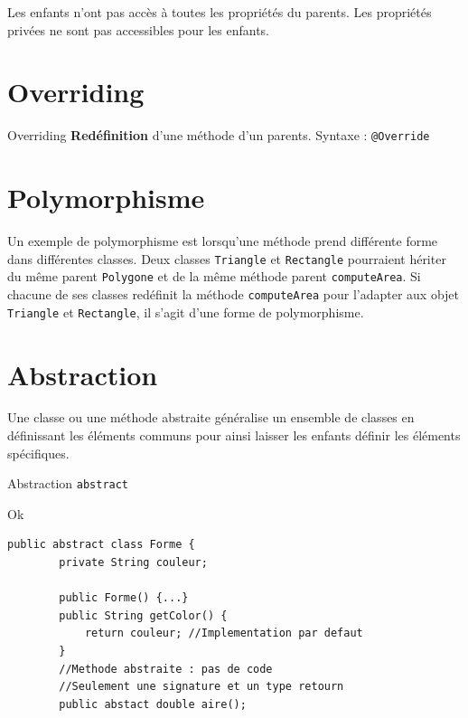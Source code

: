 \documentclass[16pt]{report}
\begin{document}
\begin{multicols*}{2}
            \begin{note}{}{}
                Les enfants n'ont pas accès à toutes les propriétés du parents. Les propriétés privées 
                ne sont pas accessibles pour les enfants. 
            \end{note}

            \section{Overriding}

            \begin{Definitionx}{Overriding}{}
                \textbf{Redéfinition} d'une méthode d'un parents. Syntaxe : \texttt{@Override}    
            \end{Definitionx}


            \section{Polymorphisme}
            Un exemple de polymorphisme est lorsqu'une méthode prend différente forme dans différentes classes. 
            Deux classes \texttt{Triangle} et \texttt{Rectangle} pourraient hériter du même parent 
            \texttt{Polygone} et de la même méthode parent \texttt{computeArea}. Si chacune de ses classes 
            redéfinit la méthode \texttt{computeArea} pour l'adapter aux objet \texttt{Triangle} et 
            \texttt{Rectangle}, il s'agit d'une forme de polymorphisme.   

            \section{Abstraction}
            Une classe ou une méthode abstraite généralise un ensemble de classes en définissant les 
            \textcolor{myb}{éléments communs} pour ainsi laisser les enfants définir les éléments spécifiques. 
            \begin{Syntaxe}{Abstraction}{}
                \texttt{abstract}  
            \end{Syntaxe}


\begin{EExample}{Ok}{}
    
\begin{lstlisting}[style=JavaDraculaWhite]
    public abstract class Forme {
        private String couleur; 

        public Forme() {...} 
        public String getColor() { 
            return couleur; //Implementation par defaut
        }
        //Methode abstraite : pas de code 
        //Seulement une signature et un type retourn
        public abstact double aire();


\end{lstlisting}
\end{EExample}
\end{multicols*}
\end{document}
